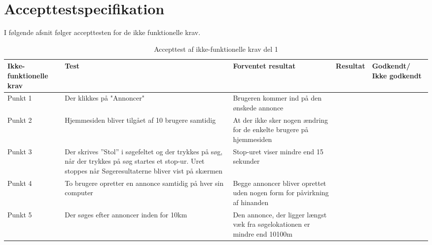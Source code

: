 \chapter{Accepttestspecifikation}\label{ch:Accepttestspecifikation}
I følgende afsnit følger accepttesten for de ikke funktionelle krav.

\setlength{\arrayrulewidth}{0.3mm}
\setlength{\tabcolsep}{12pt}
\renewcommand{\arraystretch}{1.5}
\begin{table}[H]
	\begin{tabular}{ |p{2.3cm}|p{2.2cm}|p{2.2cm}|p{2.2cm}|p{2.2cm}| } 
		\hline
		\textbf{Ikke-funktionelle krav} & \textbf{Test} & \textbf{Forventet resultat} & \textbf{Resultat} & \textbf{Godkendt/ Ikke godkendt} \\
		\hline
		Punkt 1 & Der klikkes på "Annoncer"  & Brugeren kommer ind på den ønskede annonce &  & \\
		\hline
		Punkt 2 & Hjemmesiden bliver tilgået af 10 brugere samtidig & At der ikke sker nogen ændring for de enkelte brugere på hjemmesiden &  &  \\
		\hline
		Punkt 3 & Der skrives ''Stol'' i søgefeltet og der trykkes på søg, når der trykkes på søg startes et stop-ur. Uret stoppes når Søgeresultaterne bliver vist på skærmen & Stop-uret viser mindre end 15 sekunder &  &  \\
		\hline
		Punkt 4 & To brugere opretter en annonce samtidig på hver sin computer & Begge annoncer bliver oprettet uden nogen form for påvirkning af hinanden  &  & \\
		\hline
		Punkt 5 & Der søges efter annoncer inden for 10km & Den annonce, der ligger længst væk fra søgelokationen er mindre end 10100m &  &  \\
		\hline 
	\end{tabular}
	\caption{Accepttest af ikke-funktionelle krav del 1}
	\label{table:accepttest_ifk1}
\end{table}

